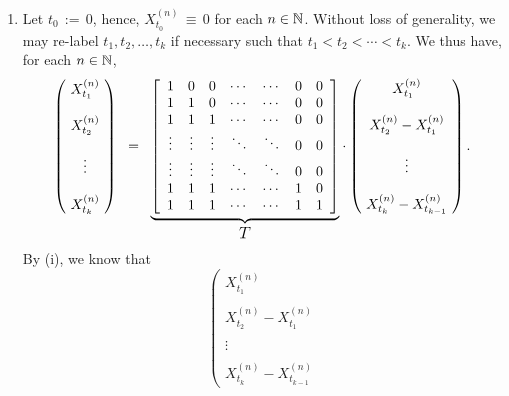 \begin{enumerate}
\item	Let $t_{0} \,:= \, 0$, hence, $X^{(n)}_{t_{0}} \,\equiv\, 0$ for each $n \in \mathbb{N}$.
	Without loss of generality, we may re-label $t_{1}, t_{2}, \ldots, t_{k}$ if necessary such that
	$t_{1} < t_{2} < \cdots < t_{k}$.
		We thus have, for each $n \in \mathbb{N}$,
		\begin{equation*}
		\left(\!
		\begin{array}{c}
		X^{(n)}_{t_{1}} \\ \\ X^{(n)}_{t_{2}} \\ \\ \vdots \\ \\ X^{(n)}_{t_{k}} 
		\end{array}
		\!\right)
		\;\; = \;\;
		\underset{\textnormal{\large$T$}}{\underbrace{
		\left[
		\begin{array}{ccccccc}
		1 & 0 & 0 & \cdots & \cdots & 0 & 0 \\
		1 & 1 & 0 & \cdots & \cdots & 0 & 0 \\
		1 & 1 & 1 & \cdots & \cdots & 0 & 0 \\
		\vdots & \vdots & \vdots & \ddots & \ddots & 0 & 0 \\
		\vdots & \vdots & \vdots & \ddots & \ddots & 0 & 0 \\
		1 & 1 & 1 & \cdots & \cdots & 1 & 0 \\
		1 & 1 & 1 & \cdots & \cdots & 1 & 1 \\
		\end{array}
		\right]
		}}
		\cdot
		\left(\!
		\begin{array}{c}
		X^{(n)}_{t_{1}} \\ \\ X^{(n)}_{t_{2}} - X^{(n)}_{t_{1}} \\ \\ \vdots \\ \\ X^{(n)}_{t_{k}} - X^{(n)}_{t_{k-1}}
		\end{array}
		\!\right).
		\end{equation*}
		By (i), we know that
		\begin{equation*}
		\left(\!
		\begin{array}{c}
		X^{(n)}_{t_{1}} \\ \\ X^{(n)}_{t_{2}} - X^{(n)}_{t_{1}} \\ \\ \vdots \\ \\ X^{(n)}_{t_{k}} - X^{(n)}_{t_{k-1}}

\end{array}
\end{equation*}
\end{enumerate}
